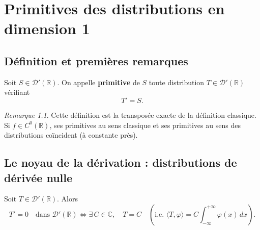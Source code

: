 \documentclass[12pt,a4paper,openany]{book}
\theoremstyle{definition}
\theoremstyle{plain}
\theoremstyle{remark}
\newtheorem*{remark}{Remarque}
\newenvironment{remarque}{\begin{remark}}{\end{remark}}
\begin{document}
	\chapter{Primitives des distributions en dimension 1}
	
	\section{Définition et premières remarques}
	
	\begin{definition}
		Soit $S \in \mathcal{D}'(\mathbb{R})$. On appelle \textbf{primitive} de $S$ toute distribution $T \in \mathcal{D}'(\mathbb{R})$ vérifiant
		\[
		T' = S.
		\]
	\end{definition}
	
	\begin{remarque}
		Cette définition est la transposée exacte de la définition classique. Si $f \in C^0(\mathbb{R})$, ses primitives au sens classique et ses primitives au sens des distributions coïncident (à constante près).
	\end{remarque}
	
	\section{Le noyau de la dérivation : distributions de dérivée nulle}
	
	\begin{lemma}
		Soit $T \in \mathcal{D}'(\mathbb{R})$. Alors
		\[
		T' = 0 \quad \text{dans } \mathcal{D}'(\mathbb{R})
		\iff
		\exists\, C \in \mathbb{C}, \quad T = C
		\quad\left(\text{i.e. } \langle T, \varphi\rangle = C\int_{-\infty}^{+\infty}\varphi(x)\,dx\right).
		\]
	\end{lemma}
	
\end{document}
